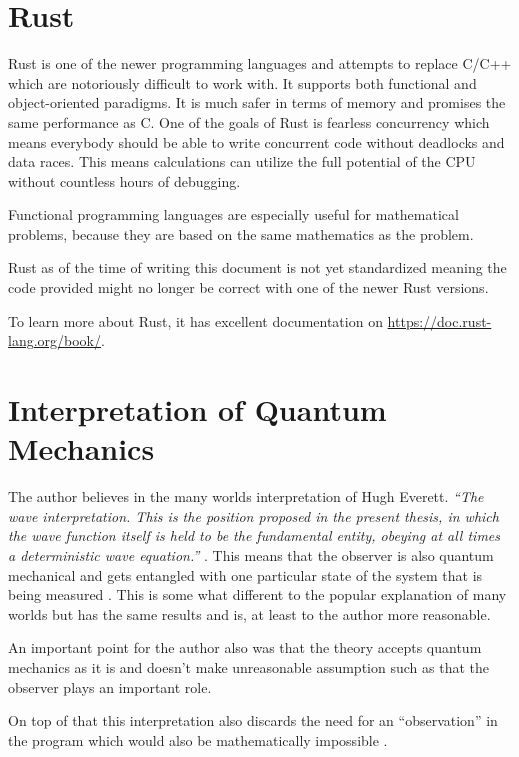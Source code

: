 \documentclass[11pt,DIV=10,final]{scrreprt} %
\begin{document}
\section{Rust}
Rust is one of the newer programming languages and attempts to replace C/C++ which are notoriously difficult to work with. It supports both functional and object-oriented paradigms. It is much safer in terms of memory and promises the same performance as C. One of the goals of Rust is fearless concurrency which means everybody should
be able to write concurrent code without deadlocks and data races. This means calculations can utilize the full potential of the CPU without countless hours of debugging.

Functional programming languages are especially useful for mathematical problems, because they are based on the same mathematics as the problem.

Rust as of the time of writing this document is not yet standardized meaning the code provided might no longer be correct with one of the newer Rust versions.

To learn more about Rust, it has excellent documentation on \url{https://doc.rust-lang.org/book/}.

\section{Interpretation of Quantum Mechanics}
The author believes in the many worlds interpretation of Hugh Everett. \emph{``The wave interpretation. This is the position proposed in the present thesis, in which the wave function itself is held to be
the fundamental entity, obeying at all times a deterministic wave equation.''} \citep[p. 115]{dewitt2015many}. This means that the observer is also quantum mechanical and gets entangled with one particular
state of the system that is being measured \citep[p. 116]{dewitt2015many}. This is some what different to the popular explanation of many worlds but has the same results and is, at least to the author
more reasonable.

An important point for the author also was that the theory accepts quantum mechanics as it is and doesn't make unreasonable assumption such as that the observer plays an important role.

On top of that this interpretation also discards the need for an ``observation'' in the program which would also be mathematically impossible \citep[p. 111]{dewitt2015many}.
\end{document}
